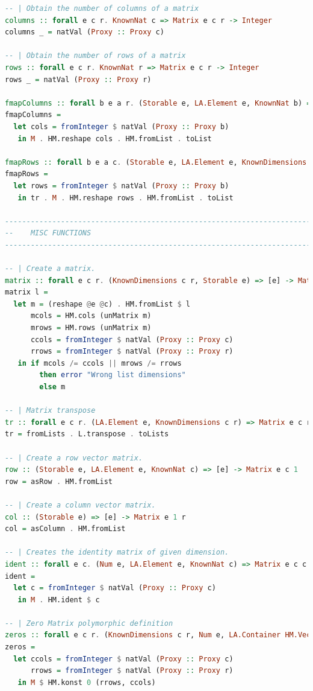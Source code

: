 \documentclass[
  oneside,
  11pt, a4paper,
  footinclude=true,
  headinclude=true,
  cleardoublepage=empty
]{scrbook}
\theoremstyle{definition}
\theoremstyle{definition}
\begin{document}
\begin{lstlisting}[language=Haskell, caption={Matrix.Internal},captionpos=b]
-- | Obtain the number of columns of a matrix
columns :: forall e c r. KnownNat c => Matrix e c r -> Integer
columns _ = natVal (Proxy :: Proxy c)

-- | Obtain the number of rows of a matrix
rows :: forall e c r. KnownNat r => Matrix e c r -> Integer
rows _ = natVal (Proxy :: Proxy r)

fmapColumns :: forall b e a r. (Storable e, LA.Element e, KnownNat b) => Matrix e a r -> Matrix e b r
fmapColumns =
  let cols = fromInteger $ natVal (Proxy :: Proxy b)
   in M . HM.reshape cols . HM.fromList . toList

fmapRows :: forall b e a c. (Storable e, LA.Element e, KnownDimensions c b) => Matrix e c a -> Matrix e c b
fmapRows =
  let rows = fromInteger $ natVal (Proxy :: Proxy b)
   in tr . M . HM.reshape rows . HM.fromList . toList

-------------------------------------------------------------------------------
--    MISC FUNCTIONS
-------------------------------------------------------------------------------

-- | Create a matrix.
matrix :: forall e c r. (KnownDimensions c r, Storable e) => [e] -> Matrix e c r
matrix l =
  let m = (reshape @e @c) . HM.fromList $ l
      mcols = HM.cols (unMatrix m)
      mrows = HM.rows (unMatrix m)
      ccols = fromInteger $ natVal (Proxy :: Proxy c)
      rrows = fromInteger $ natVal (Proxy :: Proxy r)
   in if mcols /= ccols || mrows /= rrows
        then error "Wrong list dimensions"
        else m

-- | Matrix transpose
tr :: forall e c r. (LA.Element e, KnownDimensions c r) => Matrix e c r -> Matrix e r c
tr = fromLists . L.transpose . toLists

-- | Create a row vector matrix.
row :: (Storable e, LA.Element e, KnownNat c) => [e] -> Matrix e c 1
row = asRow . HM.fromList

-- | Create a column vector matrix.
col :: (Storable e) => [e] -> Matrix e 1 r
col = asColumn . HM.fromList

-- | Creates the identity matrix of given dimension.
ident :: forall e c. (Num e, LA.Element e, KnownNat c) => Matrix e c c
ident =
  let c = fromInteger $ natVal (Proxy :: Proxy c)
   in M . HM.ident $ c

-- | Zero Matrix polymorphic definition
zeros :: forall e c r. (KnownDimensions c r, Num e, LA.Container HM.Vector e) => Matrix e c r
zeros =
  let ccols = fromInteger $ natVal (Proxy :: Proxy c)
      rrows = fromInteger $ natVal (Proxy :: Proxy r)
   in M $ HM.konst 0 (rrows, ccols)


\end{lstlisting}
\end{document}
